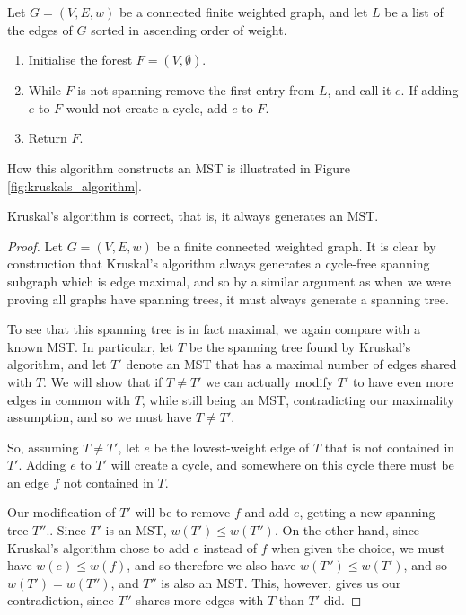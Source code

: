 \documentclass[nobib]{tufte-handout}
\begin{document}
\begin{definition}
  Let $G = (V,E,w)$ be a connected finite weighted graph, and let $L$ be a list of the edges of $G$ sorted in ascending order of weight.
  \begin{enumerate}
      \item Initialise the forest $F = (V, \emptyset)$. 
      \item While $F$ is not spanning remove the first entry from $L$, and call it $e$. If adding $e$ to $F$ would not create a cycle, add $e$ to $F$.
      \item Return $F$.
  \end{enumerate}

  How this algorithm constructs an MST is illustrated in Figure \ref{fig:kruskals_algorithm}.
\end{definition}

\begin{theorem}
  Kruskal's algorithm is correct, that is, it always generates an MST.

  \begin{proof}
    Let $G = (V,E,w)$ be a finite connected weighted graph. It is clear by construction that Kruskal's algorithm always generates a cycle-free spanning subgraph which is edge maximal, and so by a similar argument as when we were proving all graphs have spanning trees, it must always generate a spanning tree.

    To see that this spanning tree is in fact maximal, we again compare with a known MST. In particular, let $T$ be the spanning tree found by Kruskal's algorithm, and let $T'$ denote an MST that has a maximal number of edges shared with $T$. We will show that if $T \neq T'$ we can actually modify $T'$ to have even more edges in common with $T$, while still being an MST, contradicting our maximality assumption, and so we must have $T \neq T'$.

    So, assuming $T \neq T'$, let $e$ be the lowest-weight edge of $T$ that is not contained in $T'$. Adding $e$ to $T'$ will create a cycle, and somewhere on this cycle there must be an edge $f$ not contained in $T$.

    Our modification of $T'$ will be to remove $f$ and add $e$, getting a new spanning tree $T''$.. Since $T'$ is an MST, $w(T') \leq w(T'')$. On the other hand, since Kruskal's algorithm chose to add $e$ instead of $f$ when given the choice, we must have $w(e) \leq w(f)$, and so therefore we also have $w(T'') \leq w(T')$, and so $w(T') = w(T'')$, and $T''$ is also an MST. This, however, gives us our contradiction, since $T''$ shares more edges with $T$ than $T'$ did.
  \end{proof}
\end{theorem}
\end{document}

